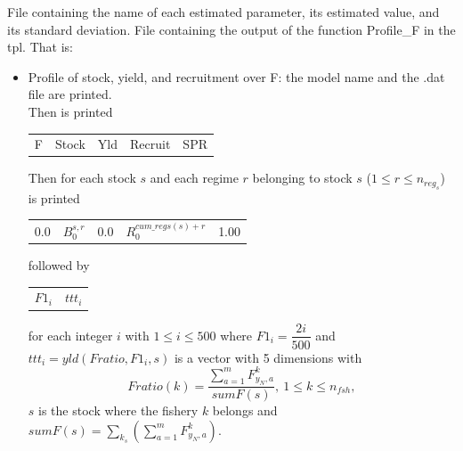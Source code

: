 \documentclass{article}
\newcounter{subsubsubsection}[subsubsection]
\begin{document}
    
     File containing the name of each estimated parameter, its estimated value, and its standard deviation.
     File containing the output of the function Profile\_F in the tpl. That is: 
    \begin{itemize}
        \item Profile of stock, yield, and recruitment over F: the model name and the .dat file are printed.\\
        Then is printed
        \begin{center}
            \begin{tabular}{c c c c c}
                F & Stock & Yld & Recruit & SPR\\
            \end{tabular}
        \end{center}
        Then for each stock $s$ and each regime $r$ belonging to stock $s$ ($1\leq r \leq n_{reg_s}$) is printed 
        \begin{center}
            \begin{tabular}{c c c c c}
              0.0   &  $B_0^{s,r}$ & 0.0 & $R_0^{cum\_regs(s)+r}$ & 1.00\\
            \end{tabular}
        \end{center}
        followed by 
        \begin{center}
            \begin{tabular}{c c}
               $F1_i$  & $ttt_i$ \\
            \end{tabular}
        \end{center}
    for each integer $i$ with $1\leq i \leq 500$ where $F1_i=\dfrac{2i}{500}$ and $ttt_i=yld(Fratio, F1_i, s)$ is a vector with 5 dimensions with 
    \begin{equation*}
        Fratio(k)=\dfrac{\sum_{a=1}^m F^k_{y_N,a}}{sumF(s)}, \ 1\leq k \leq n_{fsh},
    \end{equation*}
     $s$ is the stock where the fishery $k$ belongs and $sumF(s)=\sum_{k_s}\left(\sum_{a=1}^mF^{k}_{y_N,a}\right)$.
        
    \end{itemize}
\end{document}
